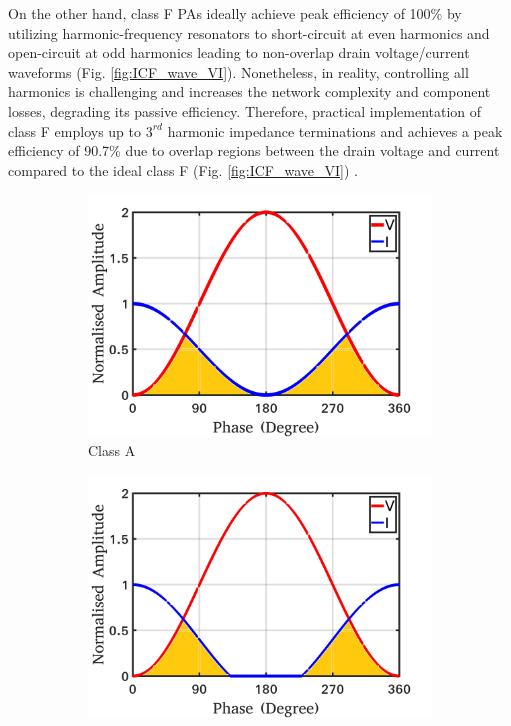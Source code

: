 \documentclass[conference]{IEEEtran}
\begin{document}
On the other hand, class F PAs ideally achieve peak efficiency of 100\% by utilizing harmonic-frequency resonators to short-circuit at even harmonics and open-circuit at odd harmonics leading to non-overlap drain voltage/current waveforms (Fig. \ref{fig:ICF_wave_VI}). Nonetheless, in reality, controlling all harmonics is challenging and increases the network complexity and component losses, degrading its passive efficiency. Therefore, practical implementation of class F employs up to $3^{rd}$ harmonic impedance terminations and achieves a peak efficiency of 90.7\% due to overlap regions between the drain voltage and current compared to the ideal class F (Fig. \ref{fig:ICF_wave_VI}) \cite{Raab_max_eff}.
\begin{figure}[!t]
\centering
\captionsetup{font=footnotesize}
\begin{subfigure}{0.24\textwidth}
\includegraphics[width=1\textwidth]{Images/Intro/ClassA_shaded.jpg}
\caption{Class A}
\label{fig:CA_wave_VI}
\end{subfigure}
\begin{subfigure}{0.24\textwidth}
\includegraphics[width=1\textwidth]{Images/Intro/ClassB_shaded.jpg}

\end{subfigure}
\end{figure}
\end{document}
